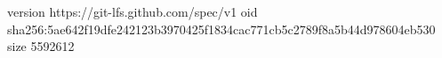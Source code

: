 version https://git-lfs.github.com/spec/v1
oid sha256:5ae642f19dfe242123b3970425f1834cac771cb5c2789f8a5b44d978604eb530
size 5592612
